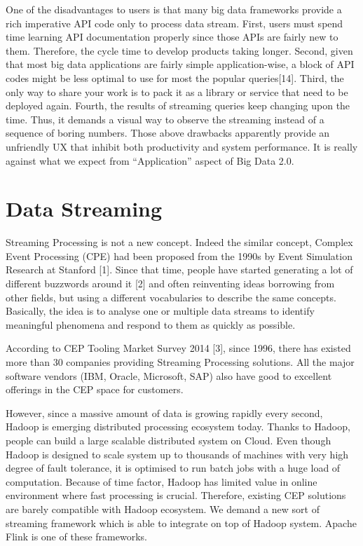 One of the disadvantages to users is that many big data frameworks provide a rich imperative API code only to process data stream. First, users must spend time learning API documentation properly since those APIs are fairly new to them. Therefore, the cycle time to develop products taking longer. Second, given that most big data applications are fairly simple application-wise, a block of API codes might be less optimal to use for most the popular queries[14]. Third, the only way to share your work is to pack it as a library or service that need to be deployed again. Fourth, the results of streaming queries keep changing upon the time. Thus, it demands a visual way to observe the streaming instead of a sequence of boring numbers.  Those above drawbacks apparently provide an unfriendly UX that inhibit both productivity and system performance. It is really against what we expect from “Application” aspect of Big Data 2.0.


\section*{Data Streaming}
Streaming Processing is not a new concept. Indeed the similar concept, Complex Event Processing (CPE) had been proposed from the 1990s by Event Simulation Research at Stanford [1]. Since that time, people have started generating a lot of different buzzwords around it [2] and often reinventing ideas borrowing from other fields, but using a different vocabularies to describe the same concepts. Basically, the idea is to analyse one or multiple data streams to identify meaningful phenomena and respond to them as quickly as possible. 


According to CEP Tooling Market Survey 2014 [3], since 1996, there has existed more than 30 companies providing Streaming Processing solutions. All the major software vendors (IBM, Oracle, Microsoft, SAP) also have good to excellent offerings in the CEP space for customers. 


However, since a massive amount of data is growing rapidly every second, Hadoop is emerging distributed processing ecosystem today. Thanks to Hadoop, people can build a large scalable distributed system on Cloud. Even though Hadoop is designed to scale system up to thousands of machines with very high degree of fault tolerance, it is optimised to run batch jobs with a huge load of computation. Because of time factor, Hadoop has limited value in online environment where fast processing is crucial. Therefore, existing CEP solutions are barely compatible with Hadoop ecosystem.  We demand a new sort of streaming framework which is able to integrate on top of Hadoop system. Apache Flink is one of these frameworks.

